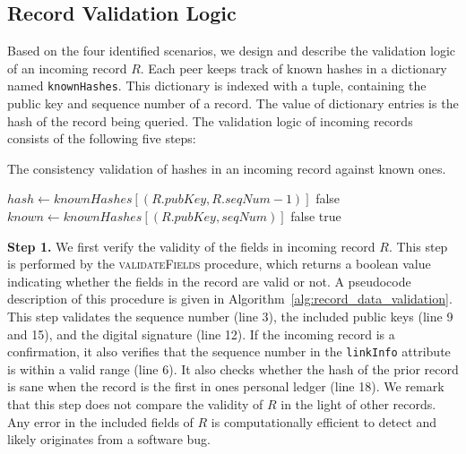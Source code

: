 \subsection{Record Validation Logic}
\label{sec:validation_logic}
Based on the four identified scenarios, we design and describe the validation logic of an incoming record $ R $.
Each peer keeps track of known hashes in a dictionary named \texttt{knownHashes}.
This dictionary is indexed with a tuple, containing the public key and sequence number of a record.
The value of dictionary entries is the hash of the record being queried.
The validation logic of incoming records consists of the following five steps:

\begin{algorithm}[t]
	\caption{The consistency validation of hashes in an incoming record against known ones.}
	\label{alg:record_validation_step4}
	\begin{algorithmic}[1]
		
		  
		\State $ hash \leftarrow knownHashes[(R.pubKey, R.seqNum - 1)] $
		\State \Return false
		\EndIf
		\State
		\State $ known \leftarrow knownHashes[(R.pubKey, seqNum)] $
		\State \Return false
		\EndIf
		\EndFor
		\State \Return true
		\EndProcedure
		
	\end{algorithmic}
\end{algorithm}

\textbf{Step 1.}
We first verify the validity of the fields in incoming record $ R $.
This step is performed by the \textsc{validateFields} procedure, which returns a boolean value indicating whether the fields in the record are valid or not.
A pseudocode description of this procedure is given in Algorithm~\ref{alg:record_data_validation}.
This step validates the sequence number (line 3), the included public keys (line 9 and 15), and the digital signature (line 12).
If the incoming record is a confirmation, it also verifies that the sequence number in the \texttt{linkInfo} attribute is within a valid range (line 6).
It also checks whether the hash of the prior record is sane when the record is the first in ones personal ledger (line 18).
We remark that this step does not compare the validity of $ R $ in the light of other records.
Any error in the included fields of $ R $ is computationally efficient to detect and likely originates from a software bug.

